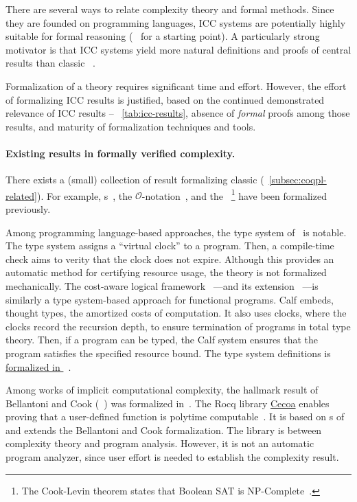 There are several ways to relate complexity theory and formal methods. Since
they are founded on programming languages, ICC systems are potentially highly
suitable for formal reasoning (\cf~\textcite{cpierce20222} for a starting
point). A particularly strong motivator is that ICC systems yield more natural
definitions and proofs of central results than classic ~\cite{kristiansen2017}.

Formalization of a theory requires significant time and effort.
However, the effort of formalizing ICC results is justified, based on the
continued demonstrated relevance of ICC results -- \cf~\autoref{tab:icc-results},
absence of \emph{formal} proofs among those results, and
maturity of formalization techniques and tools.

\paragraph*{Existing results in formally verified complexity.}
There exists a (small) collection of result formalizing classic  (\cf~\autoref{subsec:coqpl-related}). For example,
s~\cite{forster2020}, the
\(\mathcal{O}\)-notation~\cite{gueneau2018},
and the ~\cite{gaher2021}\footnote{
The Cook-Levin theorem states that Boolean SAT is NP-Complete~\cite{cook1971, levin1973}.}
have been formalized previously.

Among programming language-based approaches, the type system of~\cite{crary2000}
is notable. The type system assigns a \enquote{virtual clock} to a program.
Then, a compile-time check aims to verity that the clock does not expire.
Although this provides an automatic method for certifying resource usage, the
theory is not formalized mechanically. The cost-aware logical framework
~\cite{niu2022}---and its extension
~\cite{grodin2024}---is similarly a type system-based approach for
functional programs. Calf embeds, thought types, the amortized
costs of computation. It also uses clocks, where the clocks
record the recursion depth, to ensure termination of programs in total type
theory. Then, if a program can be typed, the Calf system ensures that the
program satisfies the specified resource bound. The type system definitions is
\href{https://github.com/HarrisonGrodin/agda-calf}{formalized in
}~\cite{grodin2023}.

Among works of implicit computational complexity, the hallmark result of
Bellantoni and Cook (~) was formalized
in~\textcite{heraud2011}. The Rocq library
\href{https://github.com/davidnowak/cecoa}{Cecoa}{} enables proving
that a user-defined function is polytime computable~\cite{feree2018}. It is
based on s of~\textcite{marion2000} and extends the
Bellantoni and Cook formalization. The  library is between complexity
theory and program analysis. However, it is not an automatic program analyzer,
since user effort is needed to establish the complexity result.

